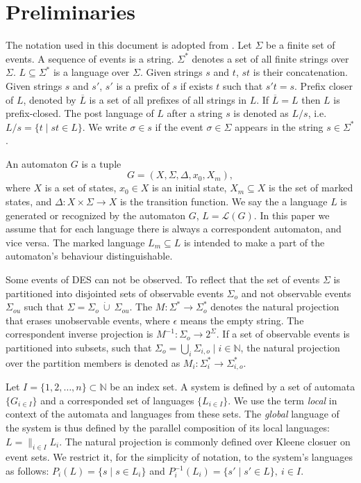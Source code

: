 \documentclass[a4paper, 10pt, conference]{ieeeconf}
\begin{document}
\section{Preliminaries}
\label{sec:Preliminaries}
The notation used in this document is adopted from
\cite{cassandras_introduction_2010}.
Let $\Sigma$ be a finite set of events. A sequence of events is a string.
$\Sigma^*$ denotes a set of all finite strings over $\Sigma$.
$L\subseteq\Sigma^*$ is a language over $\Sigma$. Given strings $s$ and $t$,
$st$ is their concatenation. Given strings $s$ and $s'$, $s'$ is a prefix of $s$
if exists $t$ such that $s't = s$. Prefix closer of $L$, denoted by
$\overline{L}$ is a set of all prefixes of all strings in $L$.
If $\overline{L} = L$ then $L$ is prefix-closed. The post language of $L$ after
a string $s$ is denoted as $L/s$, i.e. $L/s = \{t\mid st \in L\}$. We
write $\sigma \in s$ if the event $\sigma \in \Sigma$ appears in the string $s
\in \Sigma^*$.

An automaton $G$ is a tuple $$G=(X,\Sigma,\Delta,x_0, X_m),$$ where $X$ is a
set of states, $x_0 \in X$ is an initial state, $X_m \subseteq X$ is the set of
marked states, and $\Delta: X \times \Sigma \rightarrow X$ is the transition
function.
We say the a language $L$ is generated or recognized by the automaton $G$, $L =
\mathcal{L}(G)$. In this paper we assume that for each language there is always
a correspondent automaton, and vice versa. The marked language $L_m \subseteq
L$ is intended to make a part of the automaton's behaviour distinguishable.

Some events of DES can not be observed. To reflect that the set of events
$\Sigma$ is partitioned into disjointed sets of observable events $\Sigma_o$ and
not observable events $\Sigma_{ou}$ such that $\Sigma = \Sigma_o~\dot{\cup}~
\Sigma_{ou}$.
The $M: \Sigma^* \rightarrow \Sigma_o^*$ denotes the natural projection that
erases unobservable events, where $\epsilon$ means the empty string. The
correspondent inverse projection is $M^{-1}: \Sigma_o \rightarrow 2^\Sigma$. If
a set of observable events is partitioned into subsets, such that $\Sigma_o =
\bigcup_i \Sigma_{i,o} \mid i \in \mathbb{N}$, the natural projection over the
partition members is denoted as $M_i: \Sigma_i^* \rightarrow \Sigma_{i,o}^*$.

Let $I = \{1,2,\ldots,n\} \subset  \mathbb{N}$ be an index set. A system is
defined by a set of automata $\{G_{i \in I}\}$ and a corresponded set
of languages $\{L_{i \in I}\}$. We use the term \emph{local} in context
of the automata and languages from these sets. The \emph{global} language of the
system is thus defined by the parallel composition of its local languages: $L =
\parallel_{i \in I} L_i$.
The natural projection is commonly defined over Kleene closuer on event sets.
We restrict it, for the simplicity of notation, to the system's languages as
follows: $P_i(L) = \{s\mid s\in L_{i}\}$ and $P_i^{-1}(L_{i}) = \{s' \mid s' \in
L\}, ~i \in I$.
\end{document}
